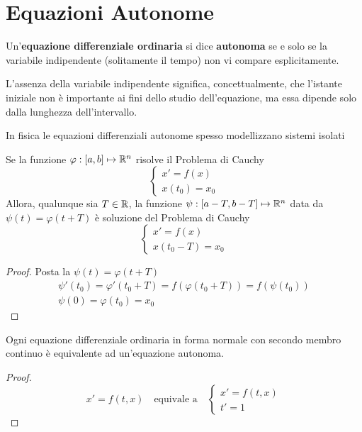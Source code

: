 \section{Equazioni Autonome}
\begin{definition}
	\label{def:equaz_diff_auton}
	Un'\textbf{equazione differenziale ordinaria} si dice \textbf{autonoma} se e solo se la variabile indipendente (solitamente il tempo) non vi compare esplicitamente.
	\begin{note}
		L'assenza della variabile indipendente significa, concettualmente, che l'istante iniziale non è importante ai fini dello studio dell'equazione, ma essa dipende solo dalla lunghezza dell'intervallo.
	\end{note}
	\begin{note}
		In fisica le equazioni differenziali autonome spesso modellizzano sistemi isolati
	\end{note}
\end{definition}
\begin{proposition}
	Se la funzione $\varphi: \left[a,b\right] \mapsto \mathbb{R}^n$ risolve il Problema di Cauchy
	\begin{equation*}\begin{cases}
		x'=f(x)\\
		x(t_0) = x_0
	\end{cases}\end{equation*}
	Allora, qualunque sia $T \in \mathbb{R}$, la funzione $\psi: \left[a - T,b - T\right] \mapsto \mathbb{R}^n$ data da $\psi(t) = \varphi(t + T)$ è soluzione del Problema di Cauchy
	\begin{equation*}\begin{cases}
		x'=f(x)\\
		x(t_0 - T) = x_0
	\end{cases}\end{equation*}
	\begin{proof}
		Posta la $\psi(t)=\varphi(t+T)$
		\begin{equation*}\begin{gathered}
			\psi'(t_0)= \varphi'(t_0+T)=f(\varphi(t_0+T))=f(\psi(t_0))\\
			\psi(0)=\varphi(t_0)=x_0
		\end{gathered}\end{equation*}
	\end{proof}
\end{proposition}
\begin{proposition}
	Ogni equazione differenziale ordinaria in forma normale con secondo membro continuo è equivalente ad un'equazione autonoma.
	\begin{proof}
		\begin{equation*}
			x' = f(t,x)
			\quad\text{equivale a}\quad
			\begin{cases}
				x'=f(t,x)\\
				t'=1
			\end{cases}
		\end{equation*}
	\end{proof}
\end{proposition}
